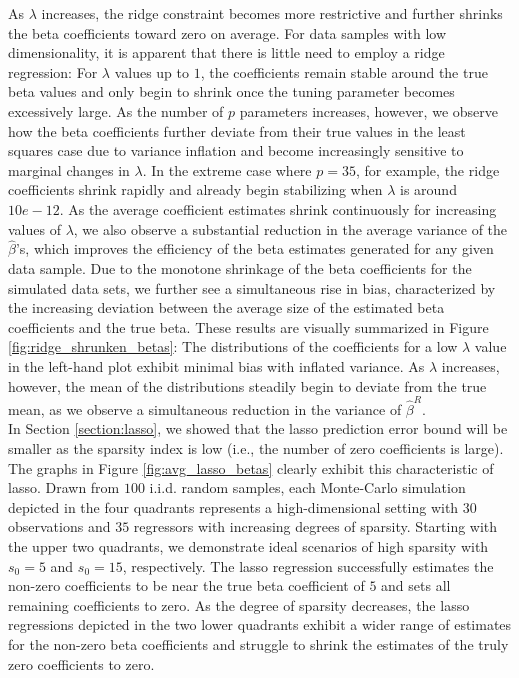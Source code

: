 \noindent As $\lambda$ increases, the ridge constraint becomes more restrictive and further shrinks the beta coefficients toward zero on average. For data samples with low dimensionality, it is apparent that there is little need to employ a ridge regression: For $\lambda$ values up to $1$, the coefficients remain stable around the true beta values and only begin to shrink once the tuning parameter becomes excessively large. As the number of $p$ parameters increases, however, we observe how the beta coefficients further deviate from their true values in the least squares case due to variance inflation and become increasingly sensitive to marginal changes in $\lambda$. In the extreme case where $p = 35$, for example, the ridge coefficients shrink rapidly and already begin stabilizing when $\lambda$ is around $10e-12$. As the average coefficient estimates shrink continuously for increasing values of $\lambda$, we also observe a substantial reduction in the average variance of the $\hat{\beta}$'s, which improves the efficiency of the beta estimates generated for any given data sample. Due to the monotone shrinkage of the beta coefficients for the simulated data sets, we further see a simultaneous rise in bias, characterized by the increasing deviation between the average size of the estimated beta coefficients and the true beta. These results are visually summarized in Figure \ref{fig:ridge_shrunken_betas}: The distributions of the coefficients for a low $\lambda$ value in the left-hand plot exhibit minimal bias with inflated variance. As $\lambda$ increases, however, the mean of the distributions steadily begin to deviate from the true mean, as we observe a simultaneous reduction in the variance of $\hat{\beta}^R$. \\  

\noindent In Section \ref{section:lasso}, we showed that the lasso prediction error bound will be smaller as the sparsity index is low (i.e., the number of zero coefficients is large). The graphs in Figure \ref{fig:avg_lasso_betas} clearly exhibit this characteristic of lasso. Drawn from $100$ i.i.d. random samples, each Monte-Carlo simulation depicted in the four quadrants represents a high-dimensional setting with $30$ observations and $35$ regressors with increasing degrees of sparsity. Starting with the upper two quadrants, we demonstrate ideal scenarios of high sparsity with $s_0=5$ and $s_0=15$, respectively. The lasso regression successfully estimates the non-zero coefficients to be near the true beta coefficient of $5$ and sets all remaining coefficients to zero. As the degree of sparsity decreases, the lasso regressions depicted in the two lower quadrants exhibit a wider range of estimates for the non-zero beta coefficients and struggle to shrink the estimates of the truly zero coefficients to zero. \\

